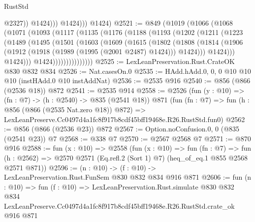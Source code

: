 \begin{lexlean}{RustStd}
\begin{coremodule}
                      @2327))
                  @1424)))
            @1424)))
      @1424)
@2521 := @849
    (@1019
      (@1066
        (@1068
          (@1071
            (@1093
              (@1117
                (@1135
                  (@1176
                    (@1188
                      (@1193
                        (@1202
                          (@1211
                            (@1223
                              (@1489
                                (@1495
                                  (@1501
                                    (@1603
                                      (@1609
                                        (@1615
                                          (@1802
                                            (@1808
                                              (@1814
                                                (@1906
                                                  (@1912
                                                    (@1918 (@1989 (@1995 (@2001 @2487) @1424)))
                                                    @1424)))
                                              @1424)))
                                        @1424)))
                                  @1424)))))))))))))))
@2525 := LexLeanPreservation.Rust.CrateOK @830 @832 @834
@2526 := Nat.casesOn.{0}
@2535 := HAdd.hAdd.{0, 0, 0} @10 @10 @10 (instHAdd.{0} @10 instAddNat)
@2536 := @2535 @916
@2540 := @856 (@866 (@2536 @18)) @872
@2541 := @2535 @914
@2558 := @2526
    (fun (y : @10) => (fn : @7) -> (h : @2540) -> @835 (@2541 @18))
    @871
    (fun (fn : @7) =>
    fun (h : @856 (@866 (@2535 Nat.zero @18)) @872) =>
    LexLeanPreserve.Cc0497d4a1fc8f917b8cdf45bff19468e.R26.RustStd.fun0)
@2562 := @856 (@866 (@2536 @23)) @872
@2567 := Option.noConfusion.{0, 0} (@835 (@2541 @23)) @7
@2568 := @338 @7
@2570 := @2567 @2568 @7
@2571 := @870 @916
@2588 := fun (x : @10) =>
  @2558
    (fun (x : @10) =>
    fun (fn : @7) =>
    fun (h : @2562) => @2570 @2571 (Eq.refl.{2} (Sort 1) @7) (heq_of_eq.{1} @855 @2568 @2571 @871))
@2596 := (n : @10) -> (f : @10) -> LexLeanPreservation.Rust.FunSem @830 @832 @834 @916 @871
@2606 := fun (n : @10) =>
  fun (f : @10) =>
  LexLeanPreservation.Rust.simulate
    @830
    @832
    @834
    LexLeanPreserve.Cc0497d4a1fc8f917b8cdf45bff19468e.R26.RustStd.crate_ok
    @916
    @871
\end{coremodule}
\end{lexlean}
